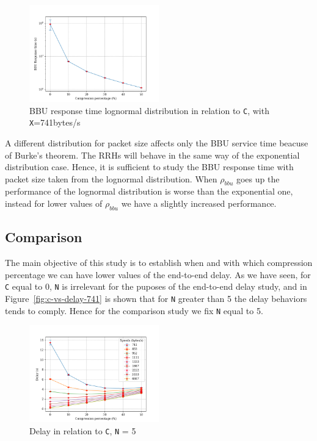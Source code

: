 \documentclass[11pt,a4paper,oneside, openright]{article}
\begin{document}
\begin{figure}[h]
	\centering
	\includegraphics[width=0.5\textwidth]{images/response-time-bbu-741-logn}
	\caption{BBU response time lognormal distribution in relation to \texttt{C}, with \texttt{X}=741bytes/s}
	\label{fig:c-vs-resp-741-logn}
\end{figure}

A different distribution for packet size affects only the BBU service time beacuse of Burke's theorem. The RRHs will behave in the same way of the exponential distribution case. Hence, it is sufficient to study the BBU response time with packet size taken from the lognormal distribution.
When $\rho_{bbu}$ goes up the performance of the lognormal distribution is worse than the exponential one, instead for lower values of $\rho_{bbu}$ we have a slightly increased performance. %


\subsection{Comparison}

The main objective of this study is to establish when and with which compression percentage we can have lower values of the end-to-end delay. As we have seen, for \texttt{C} equal to 0, \texttt{N} is irrelevant for the puposes of the end-to-end delay study, and in Figure~\ref{fig:c-vs-delay-741} is shown that for \texttt{N} greater than 5 the delay behaviors tends to comply. Hence for the comparison study we fix \texttt{N} equal to 5. 

\begin{figure}[h]
	\centering
	\includegraphics[width=0.5\textwidth]{images/c-vs-delay-comparison}
	\caption{Delay in relation to \texttt{C}, \texttt{N} = 5} 
	\label{fig:c-vs-delay-comparison}
\end{figure}
\end{document}
